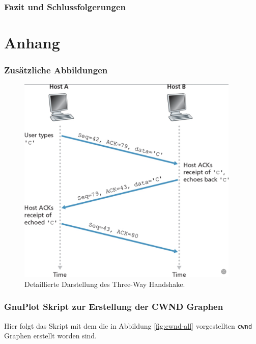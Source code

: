\documentclass[paper=a4,fontsize=12pt,ngerman]{scrartcl}
\begin{document}
\section{Fazit und Schlussfolgerungen}


\clearpage
\renewcommand\refname{Literaturverzeichnis}





\clearpage
\appendix
\part*{Anhang}


\section{Zusätzliche Abbildungen}

\begin{figure}[ht]
    \centering
    \includegraphics[height=10cm]{graphics/3way.png}
    \caption{Detaillierte Darstellung des Three-Way Handshake.}
    \label{fig:three-way handshake}
\end{figure}



\section{GnuPlot Skript zur Erstellung der CWND Graphen}
Hier folgt das Skript mit dem die in Abbildung \ref{fig:cwnd-all} vorgestellten \texttt{cwnd} Graphen erstellt worden sind.
\end{document}
